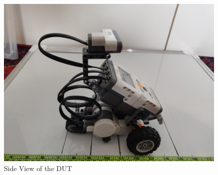 \documentclass[10pt,a4paper]{article}
\begin{document}
\begin{enumerate}[label=\Roman*]
\begin{figure}[h]
	\centering
	\includegraphics[width=0.7\linewidth]{Side_view}
	\caption{ Side View of the DUT}
\end{figure}
	

\end{enumerate}	
\end{document}
